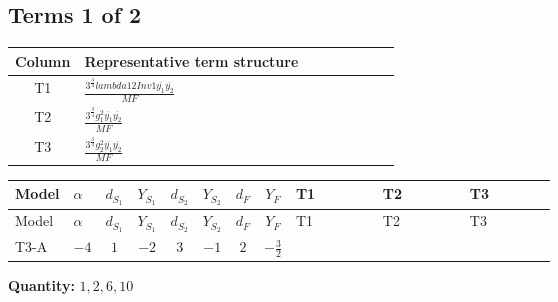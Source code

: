 \documentclass[8pt]{article}
\begin{document}
\begin{landscape}
\subsection*{Terms 1 of 2}
\begin{center}
\begin{tabular}{@{}c >{\raggedright\arraybackslash}p{0.82\linewidth}@{}}
\toprule
Column & Representative term structure \\
\midrule
T1 & \(\displaystyle \frac{3^{\frac{3}{4}} lambda12Inv1 \overline{y_{1}} \overline{y_{2}}}{MF}\) \\
\midrule
T2 & \(\displaystyle \frac{3^{\frac{3}{4}} g_{1}^{2} \overline{y_{1}} \overline{y_{2}}}{MF}\) \\
\midrule
T3 & \(\displaystyle \frac{3^{\frac{3}{4}} g_{2}^{2} \overline{y_{1}} \overline{y_{2}}}{MF}\) \\
\midrule
\bottomrule
\end{tabular}
\end{center}
\smallskip
\tiny
\begin{longtable}{@{}llcccccc >{\raggedright\arraybackslash}p{0.21\linewidth} >{\raggedright\arraybackslash}p{0.21\linewidth} >{\raggedright\arraybackslash}p{0.21\linewidth}@{}}
\toprule
Model & $\alpha$ & $d_{S_1}$ & $Y_{S_1}$ & $d_{S_2}$ & $Y_{S_2}$ & $d_F$ & $Y_F$ & T1 & T2 & T3 \\
\midrule
\endfirsthead
\toprule
Model & $\alpha$ & $d_{S_1}$ & $Y_{S_1}$ & $d_{S_2}$ & $Y_{S_2}$ & $d_F$ & $Y_F$ & T1 & T2 & T3 \\
\midrule
\endhead
T3-A & $-4$ & $1$ & $-2$ & $3$ & $-1$ & $2$ & $-\frac{3}{2}$ & \scriptsize\adjustbox{max width=\linewidth}{$\begin{gathered} \frac{3^{\frac{3}{4}} lambda12Inv1 \overline{y_{1}} \overline{y_{2}}}{6 MF}\end{gathered}$} & \scriptsize\adjustbox{max width=\linewidth}{$\begin{gathered} \frac{9 \cdot 3^{\frac{3}{4}} g_{1}^{2} \overline{y_{1}} \overline{y_{2}}}{8 MF}\end{gathered}$} & \scriptsize\adjustbox{max width=\linewidth}{$\begin{gathered} \frac{25 \cdot 3^{\frac{3}{4}} g_{2}^{2} \overline{y_{1}} \overline{y_{2}}}{24 MF}\end{gathered}$} \\
\midrule
\bottomrule
\end{longtable}
\clearpage
\noindent\textbf{Quantity: }$\mathrm{1,2,6,10}$\par\smallskip

\end{landscape}
\end{document}
